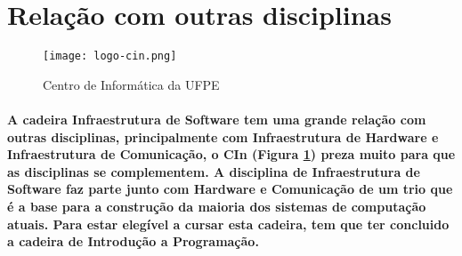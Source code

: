\documentclass{article}
\begin{document}
\section{Relação com outras disciplinas}

\begin{figure}[ht]
    \centering
    \texttt{[image: logo-cin.png]}
    \caption{Centro de Informática da UFPE}\cite{cin}
    \label{fig: cin}
\end{figure}

\paragraph{A cadeira Infraestrutura de Software tem uma grande relação com outras disciplinas, principalmente com Infraestrutura de Hardware e Infraestrutura de Comunicação, o CIn (Figura \ref{fig: cin}) preza muito para que as disciplinas se complementem. A disciplina de Infraestrutura de Software faz parte junto com Hardware e Comunicação de um trio que é a base para a construção da maioria dos sistemas de computação atuais. Para estar elegível a cursar esta cadeira, tem que ter concluido a cadeira de Introdução a Programação.}



\end{document}
